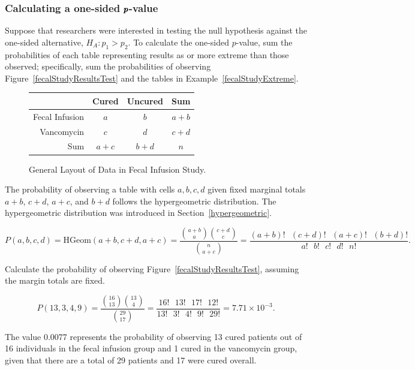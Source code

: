 \subsubsection{Calculating a one-sided $\pmb{\MakeLowercase{p}}$-value}

Suppose that researchers were interested in testing the null hypothesis against the one-sided alternative, $H_A: p_1 > p_2$. To calculate the one-sided $p$-value, sum the probabilities of each table representing results as or more extreme than those observed; specifically, sum the probabilities of observing Figure~\ref{fecalStudyResultsTest} and the tables in Example~\ref{fecalStudyExtreme}.

\begin{figure}[h]
	\centering
	\begin{tabular}{rccc}
		\hline
		& Cured & Uncured & Sum \\
		\hline
		Fecal Infusion & $a$ & $b$ & $a+b$ \\
		Vancomycin & $c$ & $d$ & $c+d$ \\
		Sum & $a+c$ & $b+d$ & $n$ \\
		\hline
	\end{tabular}
	\caption{General Layout of Data in Fecal Infusion Study.}
	\label{fecalStudyGeneral}
\end{figure}

The probability of observing a table with cells $a, b, c, d$ given fixed marginal totals $a+b$, $c+d$, $a + c$, and $b +d$ follows the hypergeometric distribution.  The hypergeometric distribution was introduced in Section~\ref{hypergeometric}.

\[P(a,b,c,d) = \text{HGeom}(a+b, c+d, a+c) = \dfrac{ {a+b \choose a} {c+d \choose c}}{{n \choose a+c}} = \dfrac{(a+b)! \text{ } (c+d)! \text{ } (a+c)! \text{ } (b+d)!}{a! \text{ } b! \text{ } c! \text{ } d! \text{ } n!}.\]

\begin{examplewrap}
\begin{nexample}{Calculate the probability of observing Figure~\ref{fecalStudyResultsTest}, assuming the margin totals are fixed.}

\[P(13, 3, 4, 9) = \dfrac{ {16 \choose 13} {13 \choose 4}}{{29 \choose 17}} = \dfrac{16! \text{ } 13! \text{ } 17! \text{ } 12!}{13! \text{ } 3! \text{ } 4! \text{ } 9! \text{ } 29!} = 7.71 \times 10^{-3}.\]

The value 0.0077 represents the probability of observing 13 cured patients out of 16 individuals in the fecal infusion group and 1 cured in the vancomycin group, given that there are a total of 29 patients and 17 were cured overall.
\end{nexample}
\end{examplewrap}

